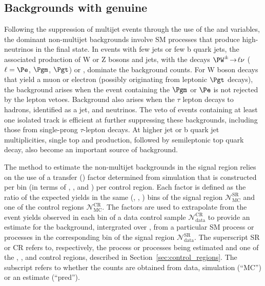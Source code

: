 \subsection{Backgrounds with genuine \texorpdfstring{\ETmiss}{MET}}
\label{sec:ewk_background}

Following the suppression of multijet events through the use of the
\alphat and \bdphi variables, the dominant non-multijet backgrounds
involve SM processes that produce high-\Pt neutrinos in the final
state. In events with few jets or few b quark jets, the associated
production of W or Z bosons and jets, with the decays $\PW^\pm
\!\rightarrow\! \ell\nu$ ($\ell=\Pe$, $\Pgm$, $\Pgt$) or \znunu,
dominate the background counts. For W boson decays that yield a muon
or electron (possibly originating from leptonic $\Pgt$ decays), the
background arises when the event containing the $\Pgm$ or $\Pe$ is not
rejected by the lepton vetoes. Background also arises when the $\tau$
lepton decays to hadrons, identified as a jet, and neutrinos. The veto
of events containing at least one isolated track is efficient at
further suppressing these backgrounds, including those from
single-prong $\tau$-lepton decays. At higher jet or b quark jet
multiplicities, single top and \ttbar production, followed by
semileptonic top quark decay, also become an important source of
background.

The method to estimate the non-multijet backgrounds in the signal
region relies on the use of a transfer (\tf) factor determined from
simulation that is constructed per bin (in terms of \njet, \nb, and
\scalht) per control region. Each \tf factor is defined as the ratio
of the expected yields in the same (\njet, \nb, \scalht) bins of the
signal region $\mathcal{N}^\text{SR}_\text{MC}$ and one of the control
regions $\mathcal{N}^\text{CR}_\text{MC}$. The \tf factors are used to
extrapolate from the event yields observed in each bin of a data
control sample $\mathcal{N}^\text{CR}_\text{data}$ to provide an
estimate for the background, intergrated over \HTmiss, from a
particular SM process or processes in the corresponding bin of the
signal region $\mathcal{N}^\text{SR}_\text{data}$. The superscript SR
or CR refers to, respectively, the process or processes being
estimated and one of the \mj, \mmj, and \gj control regions, described
in Section~\ref{sec:control_regions}. The subscript refers to whether
the counts are obtained from data, simulation (``MC'') or an estimate
(``pred'').

